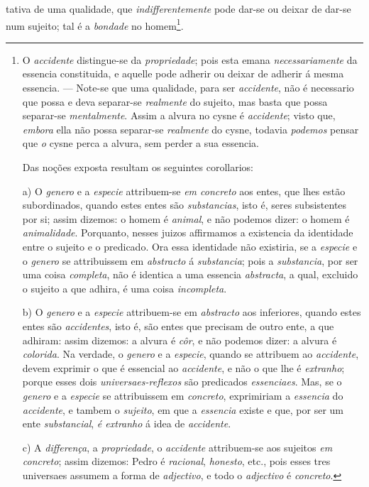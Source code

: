 tativa de uma qualidade, que \emph{indifferentemente} pode dar-se ou deixar de dar-se num sujeito; tal é a \emph{bondade} no homem\footnote{O \emph{accidente} distingue-se da \emph{propriedade}; pois esta emana \emph{necessariamente} da essencia constituida, e aquelle pode adherir ou deixar de adherir á mesma essencia. --- Note-se que uma qualidade, para ser \emph{accidente}, não é necessario que possa e deva separar-se \emph{realmente} do sujeito, mas basta que possa separar-se \emph{mentalmente}. Assim a alvura no cysne é \emph{accidente}; visto que, \emph{embora} ella não possa separar-se \emph{realmente} do cysne, todavia \emph{podemos} pensar que \emph{o} cysne perca a alvura, sem perder a sua essencia.\par Das noções exposta resultam os seguintes corollarios:\par a) O \emph{genero} e a \emph{especie} attribuem-se \emph{em concreto} aos entes, que lhes estão subordinados, quando estes entes são \emph{substancias}, isto é, seres subsistentes por si; assim dizemos: o homem é \emph{animal}, e não podemos dizer: o homem é \emph{animalidade}. Porquanto, nesses juizos affirmamos a existencia da identidade entre o sujeito e o predicado. Ora essa identidade não existiria, se a \emph{especie} e o \emph{genero} se attribuissem em \emph{abstracto} á \emph{substancia}; pois a \emph{substancia}, por ser uma coisa \emph{completa}, não é identica a uma essencia \emph{abstracta}, a qual, excluido o sujeito a que adhira, é uma coisa \emph{incompleta}.\par b) O \emph{genero} e a \emph{especie} attribuem-se em \emph{abstracto} aos inferiores, quando estes entes são \emph{accidentes}, isto é, são entes que precisam de outro ente, a que adhiram: assim dizemos: a alvura é \emph{côr}, e não podemos dizer: a alvura é \emph{colorida}. Na verdade, o \emph{genero} e a \emph{especie}, quando se attribuem ao \emph{accidente}, devem exprimir o que é essencial ao \emph{accidente}, e não o que lhe é \emph{extranho}; porque esses dois \emph{universaes-reflexos} são predicados \emph{essenciaes}. Mas, se o \emph{genero} e a \emph{especie} se attribuissem em \emph{concreto}, exprimiriam a \emph{essencia} do \emph{accidente}, e tambem o \emph{sujeito}, em que a \emph{essencia} existe e que, por ser um ente \emph{substancial}, \emph{é extranho} á idea de \emph{accidente}.\par c) A \emph{differença}, a \emph{propriedade}, o \emph{accidente} attribuem-se aos sujeitos \emph{em concreto}; assim dizemos: Pedro é \emph{racional}, \emph{honesto}, etc., pois esses tres universaes assumem a forma de \emph{adjectivo}, e todo o \emph{adjectivo} é \emph{concreto}.}.

